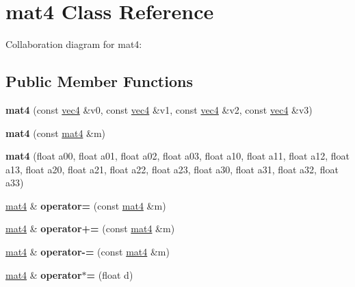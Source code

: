 \hypertarget{classmat4}{\section{mat4 Class Reference}
\label{classmat4}
}


Collaboration diagram for mat4\+:
\subsection*{Public Member Functions}
\begin{DoxyCompactItemize}
\item 
\hypertarget{classmat4_aafb0a8ad2c4ae94ff1a3e6a75f83e31e}{{\bfseries mat4} (const \hyperlink{classvec4}{vec4} \&v0, const \hyperlink{classvec4}{vec4} \&v1, const \hyperlink{classvec4}{vec4} \&v2, const \hyperlink{classvec4}{vec4} \&v3)}\label{classmat4_aafb0a8ad2c4ae94ff1a3e6a75f83e31e}

\item 
\hypertarget{classmat4_a77de7784e96322187aa6e2e49fe444ca}{{\bfseries mat4} (const \hyperlink{classmat4}{mat4} \&m)}\label{classmat4_a77de7784e96322187aa6e2e49fe444ca}

\item 
\hypertarget{classmat4_ab26db95fba65d4fc310f58216581f896}{{\bfseries mat4} (float a00, float a01, float a02, float a03, float a10, float a11, float a12, float a13, float a20, float a21, float a22, float a23, float a30, float a31, float a32, float a33)}\label{classmat4_ab26db95fba65d4fc310f58216581f896}

\item 
\hypertarget{classmat4_ab372a3fd891cf6a3ae659dc82f6ac93d}{\hyperlink{classmat4}{mat4} \& {\bfseries operator=} (const \hyperlink{classmat4}{mat4} \&m)}\label{classmat4_ab372a3fd891cf6a3ae659dc82f6ac93d}

\item 
\hypertarget{classmat4_ac8c480dafab0488e1b8a907685903f49}{\hyperlink{classmat4}{mat4} \& {\bfseries operator+=} (const \hyperlink{classmat4}{mat4} \&m)}\label{classmat4_ac8c480dafab0488e1b8a907685903f49}

\item 
\hypertarget{classmat4_a1676d34abda52da8b3a0949a9be5bc78}{\hyperlink{classmat4}{mat4} \& {\bfseries operator-\/=} (const \hyperlink{classmat4}{mat4} \&m)}\label{classmat4_a1676d34abda52da8b3a0949a9be5bc78}

\item 
\hypertarget{classmat4_a82f5152dccdf0a65dff3a3115c54db39}{\hyperlink{classmat4}{mat4} \& {\bfseries operator$\ast$=} (float d)}\label{classmat4_a82f5152dccdf0a65dff3a3115c54db39}


\end{DoxyCompactItemize}
